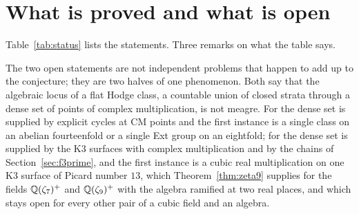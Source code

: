 \section{What is proved and what is open}\label{sec:status}


Table~\ref{tab:status} lists the statements. Three remarks on what the table says.

The two open statements are not independent problems that happen to add up to the conjecture; they are two halves of one phenomenon. Both say that the algebraic locus of a flat Hodge class, a countable union of closed strata through a dense set of points of complex multiplication, is not meagre. For \Fii{} the dense set is supplied by explicit cycles at CM points and the first instance is a single class on an abelian fourteenfold or a single Ext group on an eightfold; for \Fiii{} the dense set is supplied by the K3 surfaces with complex multiplication and by the chains of Section~\ref{sec:f3prime}, and the first instance is a cubic real multiplication on one K3 surface of Picard number $13$, which Theorem~\ref{thm:zeta9} supplies for the fields $\mathbb{Q}(\zeta_{7})^{+}$ and $\mathbb{Q}(\zeta_{9})^{+}$ with the algebra ramified at two real places, and which stays open for every other pair of a cubic field and an algebra.

